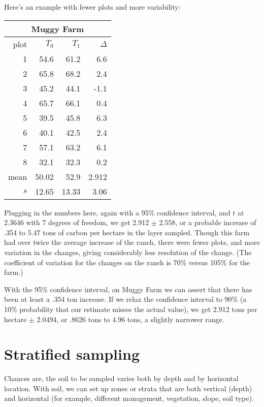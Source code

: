 \documentclass[11pt,letterpaper,oneside,onecolumn]{memoir}
\begin{document}
Here's an example with fewer plots and more variability:

\begin{center}
\begin{tabular}{|r|r|r|r|}
\multicolumn{4}{c}{\textbf{Muggy Farm}}\\ \hline
plot&$T_{0}$&$T_{1}$&$\Delta$\\ \hline\hline
1& 54.6& 61.2& 6.6\\ \hline
2& 65.8& 68.2& 2.4\\ \hline
3& 45.2& 44.1& -1.1\\ \hline
4& 65.7& 66.1& 0.4\\ \hline
5& 39.5& 45.8& 6.3\\ \hline
6& 40.1& 42.5& 2.4\\ \hline
7& 57.1& 63.2& 6.1\\ \hline
8& 32.1& 32.3& 0.2\\ \hline\hline
mean& 50.02& 52.9&2.912 \\ \hline
$s$& 12.65& 13.33& 3.06\\ \hline

\end{tabular}
\end{center}

\noindent Plugging in the numbers here, again with a 95\% confidence interval, and $t$ at 2.3646 with 7 degrees of freedom, we get 2.912 $\pm$ 2.558, or a probable increase of .354 to 5.47 tons of carbon per hectare in the layer sampled. Though this farm had over twice the average increase of the ranch, there were fewer plots, and more variation in the changes, giving considerably less resolution of the change. (The coefficient of variation for the changes on the ranch is 70\% versus 105\% for the farm.)

With the 95\% confidence interval, on Muggy Farm we can assert that there has been at least a .354 ton increase. If we relax the confidence interval to 90\% (a 10\% probability that our estimate misses the actual value), we get 2.912 tons per hectare $\pm$ 2.0494, or .8626 tons to 4.96 tons, a slightly narrower range.


\section{Stratified sampling}\label{strat}

Chances are, the soil to be sampled varies both by depth and by horizontal location. With soil, we can set up zones or strata that are both vertical (depth) and horizontal (for example, different management, vegetation, slope, soil type).
\end{document}
